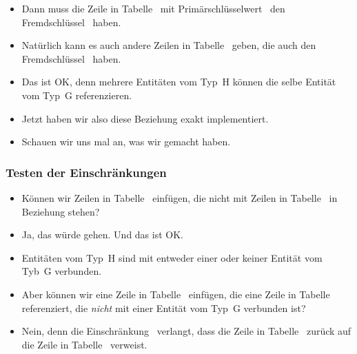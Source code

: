 \begin{frame}
{\begin{itemize}
{}%
%
\item<43-> Dann muss die Zeile in Tabelle~ mit Primärschlüsselwert~ den Fremdschlüssel~ haben.%
%
\item<44-> Natürlich kann es auch andere Zeilen in Tabelle~ geben, die auch den Fremdschlüssel~ haben.%
%
\item<45-> Das ist OK, denn mehrere Entitäten vom Typ~H können die selbe Entität vom Typ~G referenzieren.%
%
\item<46-> Jetzt haben wir also diese Beziehung exakt implementiert.%
%
\item<47-> Schauen wir uns mal an, was wir gemacht haben.%
%
\end{itemize}%
}%
%
\end{frame}%
%
%
\begin{frame}[t]%
\frametitle{Testen der Einschränkungen}%
\parbox{0.435\linewidth}{\small%
\begin{itemize}%
%
%
%
%
%
%
\item<5-> Können wir Zeilen in Tabelle~ einfügen, die nicht mit Zeilen in Tabelle~ in Beziehung stehen?%
%
\item<6-> Ja, das würde gehen. Und das ist OK.%
%
\item<7-> Entitäten vom Typ~H sind mit entweder einer oder keiner Entität vom Tyb~G verbunden.%
%
\item<8-> Aber können wir eine Zeile in Tabelle~ einfügen, die eine Zeile in Tabelle~ referenziert, die \emph{nicht} mit einer Entität vom Typ~G verbunden ist?%
%
\item<9-> Nein, denn die Einschränkung~ verlangt, dass die Zeile in Tabelle~ zurück auf die Zeile in Tabelle~ verweist.%
%
\end{itemize}%
}%
%
%
%
\end{frame}%
